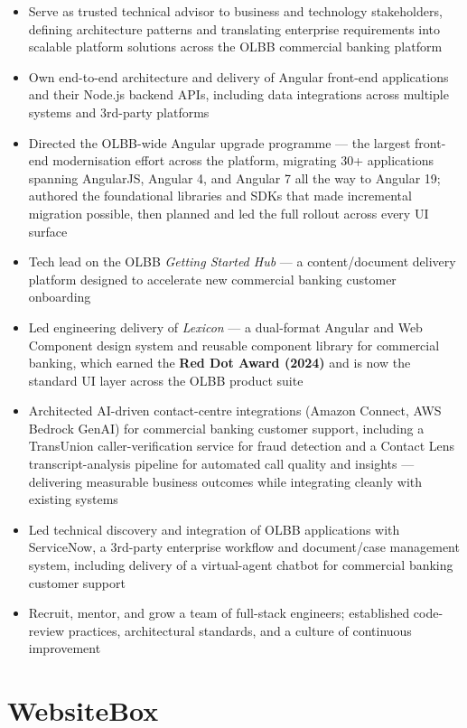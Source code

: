 \documentclass[margin]{res}
\begin{document}
\begin{resume}
	\begin{itemize} %
		\item Serve as trusted technical advisor to business and technology stakeholders, defining architecture patterns and translating enterprise requirements into scalable platform solutions across the OLBB commercial banking platform
		\item Own end-to-end architecture and delivery of Angular front-end applications and their Node.js backend APIs, including data integrations across multiple systems and 3rd-party platforms
		\item Directed the OLBB-wide Angular upgrade programme — the largest front-end modernisation effort across the platform, migrating 30+ applications spanning AngularJS, Angular 4, and Angular 7 all the way to Angular 19; authored the foundational libraries and SDKs that made incremental migration possible, then planned and led the full rollout across every UI surface
		\item Tech lead on the OLBB \textit{Getting Started Hub} — a content/document delivery platform designed to accelerate new commercial banking customer onboarding
		\item Led engineering delivery of \textit{Lexicon} — a dual-format Angular and Web Component design system and reusable component library for commercial banking, which earned the \textbf{Red Dot Award (2024)} and is now the standard UI layer across the OLBB product suite
		\item Architected AI-driven contact-centre integrations (Amazon Connect, AWS Bedrock GenAI) for commercial banking customer support, including a TransUnion caller-verification service for fraud detection and a Contact Lens transcript-analysis pipeline for automated call quality and insights — delivering measurable business outcomes while integrating cleanly with existing systems
		\item Led technical discovery and integration of OLBB applications with ServiceNow, a 3rd-party enterprise workflow and document/case management system, including delivery of a virtual-agent chatbot for commercial banking customer support
		\item Recruit, mentor, and grow a team of full-stack engineers; established code-review practices, architectural standards, and a culture of continuous improvement
	\end{itemize}

	\normalsize{\section{WebsiteBox}}


\end{resume}
\end{document}
